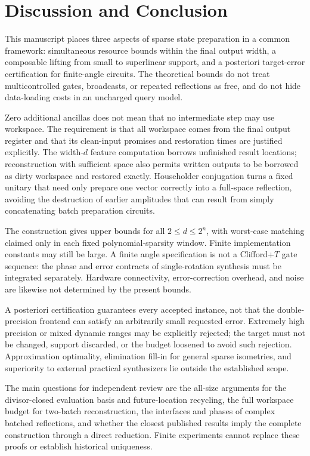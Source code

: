 \section{Discussion and Conclusion}
This manuscript places three aspects of sparse state preparation in a common framework: simultaneous resource bounds within the final output width, a composable lifting from small to superlinear support, and a posteriori target-error certification for finite-angle circuits. The theoretical bounds do not treat multicontrolled gates, broadcasts, or repeated reflections as free, and do not hide data-loading costs in an uncharged query model.

Zero additional ancillas does not mean that no intermediate step may use workspace. The requirement is that all workspace comes from the final output register and that its clean-input promises and restoration times are justified explicitly. The width-$d$ feature computation borrows unfinished result locations; reconstruction with sufficient space also permits written outputs to be borrowed as dirty workspace and restored exactly. Householder conjugation turns a fixed unitary that need only prepare one vector correctly into a full-space reflection, avoiding the destruction of earlier amplitudes that can result from simply concatenating batch preparation circuits.

The construction gives upper bounds for all $2\le d\le2^n$, with worst-case matching claimed only in each fixed polynomial-sparsity window. Finite implementation constants may still be large. A finite angle specification is not a Clifford+$T$ gate sequence: the phase and error contracts of single-rotation synthesis must be integrated separately\cite{ross2014}. Hardware connectivity, error-correction overhead, and noise are likewise not determined by the present bounds.

A posteriori certification guarantees every accepted instance, not that the double-precision frontend can satisfy an arbitrarily small requested error. Extremely high precision or mixed dynamic ranges may be explicitly rejected; the target must not be changed, support discarded, or the budget loosened to avoid such rejection. Approximation optimality, elimination fill-in for general sparse isometries, and superiority to external practical synthesizers lie outside the established scope.

The main questions for independent review are the all-size arguments for the divisor-closed evaluation basis and future-location recycling, the full workspace budget for two-batch reconstruction, the interfaces and phases of complex batched reflections, and whether the closest published results imply the complete construction through a direct reduction. Finite experiments cannot replace these proofs or establish historical uniqueness.
